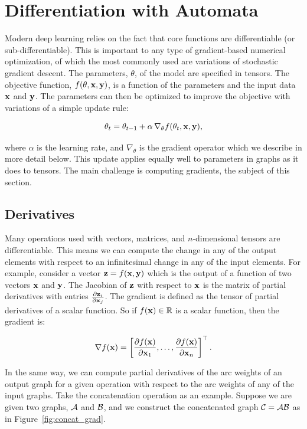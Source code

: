 \section{Differentiation with Automata}
\label{sec:differentiation_with_automata}

Modern deep learning relies on the fact that core functions are differentiable
(or sub-differentiable). This is important to any type of gradient-based
numerical optimization, of which the most commonly used are variations of
stochastic gradient descent. The parameters, $\theta$, of the model are
specified in tensors. The objective function, $f(\theta, {\bf x}, {\bf y})$, is a
function of the parameters and the input data ${\bf x}$ and ${\bf y}$. The parameters
can then be optimized to improve the objective with variations of a simple
update rule:

$$
\theta_t = \theta_{t-1} + \alpha \, \nabla_{\theta} f(\theta_t, {\bf x}, {\bf y}),
$$

where $\alpha$ is the learning rate, and $\nabla_{\theta}$ is the gradient
operator which we describe in more detail below. This update applies equally
well to parameters in graphs as it does to tensors. The main challenge is
computing gradients, the subject of this section.


\subsection{Derivatives}

Many operations used with vectors, matrices, and $n$-dimensional tensors are
differentiable. This means we can compute the change in any of the output
elements with respect to an infinitesimal change in any of the input elements.
For example, consider a vector ${\bf z} = f({\bf x}, {\bf y})$ which is the output of a
function of two vectors ${\bf x}$ and ${\bf y}$. The Jacobian of ${\bf z}$ with respect to
${\bf x}$ is the matrix of partial derivatives with entries $\frac{\partial
{\bf z}_i}{\partial {\bf x}_j}$. The gradient is defined as the tensor of partial
derivatives of a scalar function. So if $f({\bf x}) \in \mathbb{R}$ is a scalar
function, then the gradient is:

$$
\nabla f({\bf x}) = \left[ \frac{\partial f({\bf x})}{\partial {\bf x}_{1}}, \ldots,
    \frac{\partial f({\bf x})}{\partial {\bf x}_{n}}  \right]^\top.
$$

In the same way, we can compute partial derivatives of the arc weights of an
output graph for a given operation with respect to the arc weights of any of
the input graphs. Take the concatenation operation as an example. Suppose we
are given two graphs, $\mathcal{A}$ and $\mathcal{B}$, and we construct the concatenated graph
$\mathcal{C} = \mathcal{A} \mathcal{B}$ as in Figure~\ref{fig:concat_grad}.

